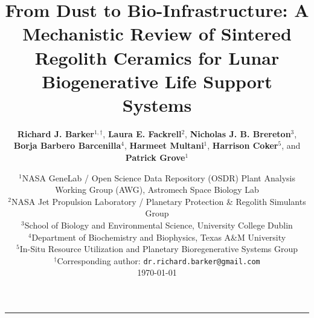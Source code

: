 \documentclass[11pt,a4paper]{article}
\begin{document}
\title{\textbf{\Large From Dust to Bio-Infrastructure: A Mechanistic Review of Sintered Regolith Ceramics for Lunar Biogenerative Life Support Systems}}

\author{
    \textbf{Richard J. Barker}$^{1,\dagger}$, \textbf{Laura E. Fackrell}$^{2}$, \textbf{Nicholas J. B. Brereton}$^{3}$, \textbf{Borja Barbero Barcenilla}$^{4}$, \textbf{Harmeet Multani}$^{1}$, \textbf{Harrison Coker}$^{5}$, and \textbf{Patrick Grove}$^{1}$
}

\date{
    \small
    $^{1}$NASA GeneLab / Open Science Data Repository (OSDR) Plant Analysis Working Group (AWG), Astromech Space Biology Lab\\
    $^{2}$NASA Jet Propulsion Laboratory / Planetary Protection \& Regolith Simulants Group\\
    $^{3}$School of Biology and Environmental Science, University College Dublin\\
    $^{4}$Department of Biochemistry and Biophysics, Texas A\&M University\\
    $^{5}$In-Situ Resource Utilization and Planetary Bioregenerative Systems Group\\[1ex]
    $^{\dagger}$Corresponding author: \texttt{dr.richard.barker@gmail.com}\\[2ex]
    \today
}

\maketitle



\vspace{1em}
\hrule
\vspace{1.5em}












\newpage


\end{document}
